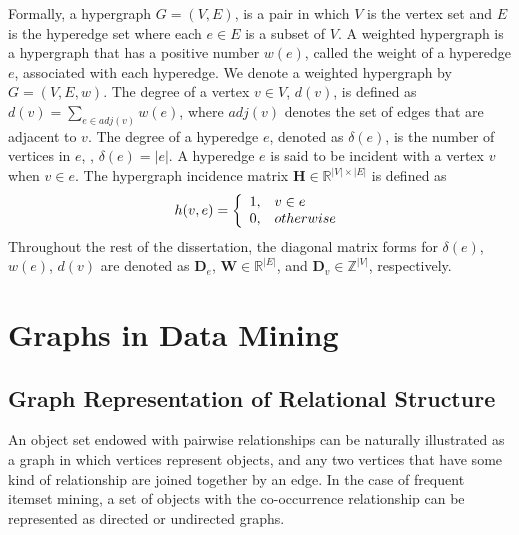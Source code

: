 \begin{mydef}\label{def:hypergraph}
Formally, a hypergraph $G = (V,E)$, is a pair in which $V$ is the vertex set and $E$ is the hyperedge set where each $e \in E$ is a subset of $V$. A weighted hypergraph is a hypergraph that has a positive number $w(e)$,  called the weight of a hyperedge $e$, associated with each hyperedge. We denote a weighted hypergraph by $G = (V,E,w)$. The degree of a vertex $v \in V$, $d(v)$, is defined as $d(v) = \sum_{e\in adj(v)}{w(e)}$, where $adj(v)$ denotes the set of edges that are adjacent to $v$. The degree of a hyperedge $e$, denoted as $\delta(e)$, is the number of vertices in $e$, \ie, $\delta(e)=|e|$. A hyperedge $e$ is said to be incident with a vertex $v$ when $v \in e$. The hypergraph incidence matrix $\mathbf{H} \in \mathbb{R}^{|V| \times |E|}$ is defined as
\begin{equation}
\notag h(v,e)=\left\{\begin{array}{cl}
	   1, & v \in e \\
	   0, & otherwise
	   \end{array}\right.
\end{equation}
Throughout the rest of the dissertation, the diagonal matrix forms for $\delta(e)$, $w(e)$, $d(v)$ are denoted as $\mathbf{D}_e$, $\mathbf{W} \in \mathbb{R}^{|E|}$, and $\mathbf{D}_v \in \mathbb{Z}^{|V|}$, respectively.
\end{mydef}

\section{Graphs in Data Mining}
\subsection{Graph Representation of Relational Structure}
\label{sec:graphForRelationalStructure}
An object set endowed with pairwise relationships can be naturally illustrated as a graph in which vertices represent objects, and any two vertices that have some kind of relationship are joined together by an edge. In the case of frequent itemset mining, a set of objects with the co-occurrence relationship can be represented as directed or undirected graphs.

